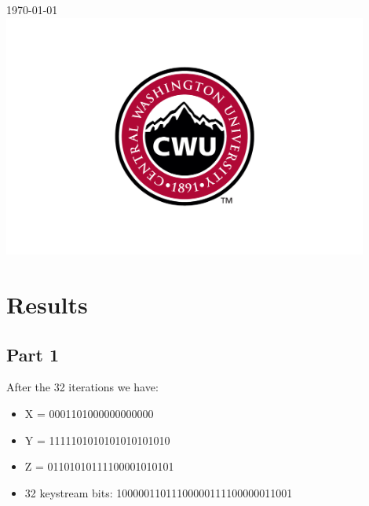 \documentclass[12pt]{article}
\begin{document}
\begin{titlepage}
		
		
		{\large \today}\\ %
		
		
		\includegraphics[width=12cm]{CWU-Logo.png}\\[.5cm] %
		
		
		\vfill %
		
	\end{titlepage}
	\newpage
	\tableofcontents
	\newpage
	
	
	
	\section{Results}
		\subsection{Part 1}
			After the 32 iterations we have:
			\begin{itemize}
				\item X = 0001101000000000000
				\item Y = 1111101010101010101010
				\item Z = 01101010111100001010101
				\item 32 keystream bits: 10000011011100000111100000011001
			\end{itemize}
		
\end{document}
